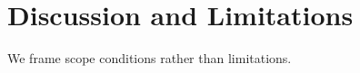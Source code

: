 \documentclass{article}
\begin{document}
\section{Discussion and Limitations}
\label{sec:discussion}

We frame scope conditions rather than limitations.
\end{document}
